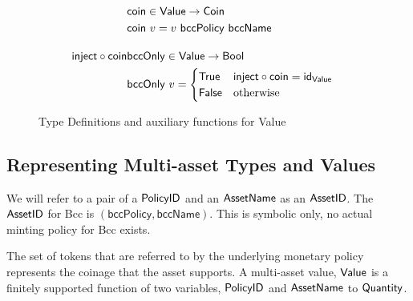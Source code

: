 \begin{figure*}[t!]
\begin{align*}
    \nextdef
    & \fun{coin} \in \Value \to \Coin \\
    & \fun{coin}~v = v~\mathsf{bccPolicy}~\mathsf{bccName}
    \nextdef \fun{inject} \circ \fun{coin}
    & \fun{bccOnly} \in \Value \to \Bool \\
    & \fun{bccOnly}~v =
      \begin{cases}
        \True & \fun{inject} \circ \fun{coin} = \fun{id}_{\Value} \\
        \False & \text{otherwise}
      \end{cases}
  \end{align*}
  \caption{Type Definitions and auxiliary functions for Value}
  \label{fig:defs:value}
\end{figure*}

\subsection*{Representing Multi-asset Types and Values}
We will refer to a pair of a $\mathsf{PolicyID}$ and an
$\mathsf{AssetName}$ as an $\mathsf{AssetID}$. The $\mathsf{AssetID}$ for Bcc is $(\mathsf{bccPolicy}, \mathsf{bccName})$.
This is symbolic only, no actual minting policy for Bcc exists.

The set of tokens that are referred to by the underlying monetary
policy represents the coinage that the asset supports. A multi-asset
value, $\mathsf{Value}$ is a finitely supported function of two variables,
$\mathsf{PolicyID}$ and $\mathsf{AssetName}$ to $\mathsf{Quantity}$.

